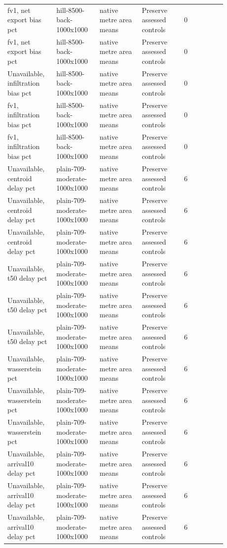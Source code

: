 \begin{longtable}{p{0.1760\linewidth}p{0.1760\linewidth}p{0.1760\linewidth}p{0.1760\linewidth}p{0.1760\linewidth}}
fv1, net export bias pct & hill-8500-back-1000x1000 & native metre area means & Preserve assessed controls & 0 \\
fv1, net export bias pct & hill-8500-back-1000x1000 & native metre area means & Preserve assessed controls & 0 \\
Unavailable, infiltration bias pct & hill-8500-back-1000x1000 & native metre area means & Preserve assessed controls & 0 \\
fv1, infiltration bias pct & hill-8500-back-1000x1000 & native metre area means & Preserve assessed controls & 0 \\
fv1, infiltration bias pct & hill-8500-back-1000x1000 & native metre area means & Preserve assessed controls & 0 \\
Unavailable, centroid delay pct & plain-709-moderate-1000x1000 & native metre area means & Preserve assessed controls & 6 \\
Unavailable, centroid delay pct & plain-709-moderate-1000x1000 & native metre area means & Preserve assessed controls & 6 \\
Unavailable, centroid delay pct & plain-709-moderate-1000x1000 & native metre area means & Preserve assessed controls & 6 \\
Unavailable, t50 delay pct & plain-709-moderate-1000x1000 & native metre area means & Preserve assessed controls & 6 \\
Unavailable, t50 delay pct & plain-709-moderate-1000x1000 & native metre area means & Preserve assessed controls & 6 \\
Unavailable, t50 delay pct & plain-709-moderate-1000x1000 & native metre area means & Preserve assessed controls & 6 \\
Unavailable, wasserstein pct & plain-709-moderate-1000x1000 & native metre area means & Preserve assessed controls & 6 \\
Unavailable, wasserstein pct & plain-709-moderate-1000x1000 & native metre area means & Preserve assessed controls & 6 \\
Unavailable, wasserstein pct & plain-709-moderate-1000x1000 & native metre area means & Preserve assessed controls & 6 \\
Unavailable, arrival10 delay pct & plain-709-moderate-1000x1000 & native metre area means & Preserve assessed controls & 6 \\
Unavailable, arrival10 delay pct & plain-709-moderate-1000x1000 & native metre area means & Preserve assessed controls & 6 \\
Unavailable, arrival10 delay pct & plain-709-moderate-1000x1000 & native metre area means & Preserve assessed controls & 6 \\

\end{longtable}
